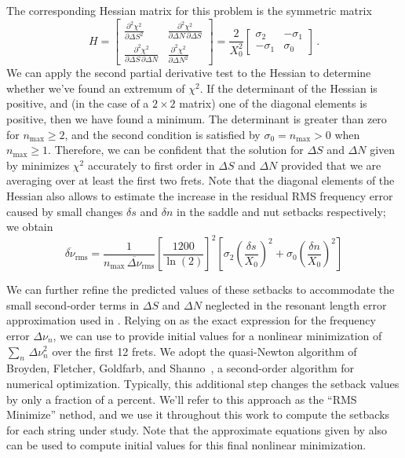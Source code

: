 The corresponding Hessian matrix for this problem is the symmetric matrix
 \begin{equation}
H = \begin{bmatrix}
      \frac{\partial^2 \chi^2}{\partial \Delta S^2} & \frac{\partial^2 \chi^2}{\partial \Delta N\, \partial \Delta S} \\
      \frac{\partial^2 \chi^2}{\partial \Delta S\, \partial \Delta N} & \frac{\partial^2 \chi^2}{\partial \Delta N^2}
    \end{bmatrix}
  = \frac{2}{X_0^2} \begin{bmatrix}
      \sigma_2 & -\sigma_1 \\
      -\sigma_1 & \sigma_0
    \end{bmatrix}\, .
 \end{equation}
We can apply the second partial derivative test to the Hessian to determine whether we've found an extremum of $\chi^2$. If the determinant of the Hessian is positive, and (in the case of a $2 \times 2$ matrix) one of the diagonal elements is positive, then we have found a minimum. The determinant is greater than zero for $n_\text{max} \ge 2$, and the second condition is satisfied by $\sigma_0 = n_\text{max} > 0$ when $n_\text{max} \ge 1$. Therefore, we can be confident that the solution for $\Delta S$ and $\Delta N$ given by  minimizes $\chi^2$ accurately to first order in $\Delta S$ and $\Delta N$ provided that we are averaging over at least the first two frets. Note that the diagonal elements of the Hessian also allows to estimate the increase in the residual RMS frequency error caused by small changes $\delta s$ and $\delta n$ in the saddle and nut setbacks respectively; we obtain
\begin{equation}
  \overline{\delta \nu}_\text{rms} = \frac{1}{n_\text{max}\, \overline{\Delta \nu}_\text{rms}} \left[ \frac{1200}{\ln(2)} \right]^2 \left[ \sigma_2 \left(\frac{\delta s}{X_0}\right)^2 + \sigma_0 \left(\frac{\delta n}{X_0}\right)^2\right]
\end{equation}

We can further refine the predicted values of these setbacks to accommodate the small second-order terms in $\Delta S$ and $\Delta N$ neglected in the resonant length error approximation used in . Relying on  as the exact expression for the frequency error $\Delta \nu_n$, we can use  to provide initial values for a nonlinear minimization of $\sum_n\, \Delta \nu_n^2$ over the first 12 frets. We adopt the quasi-Newton algorithm of Broyden, Fletcher, Goldfarb, and Shanno~\cite{ref:nocedal2006no}, a second-order algorithm for numerical optimization. Typically, this additional step changes the setback values by only a fraction of a percent. We'll refer to this approach as the ``RMS Minimize'' nethod, and we use it throughout this work to compute the setbacks for each string under study. Note that the approximate equations given by  also can be used to compute initial values for this final nonlinear minimization.

